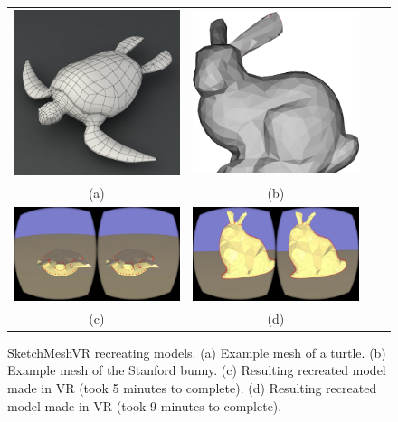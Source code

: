 \begin{figure}[!h]
    \centering
    \setlength{\tabcolsep}{0.0130\linewidth}
    \begin{tabular}{@{}cccc@{}}
    \includegraphics[width=0.45\linewidth]{figures/example_model_turtle}&
        \includegraphics[width=0.45\linewidth]{figures/example_model_bunny}\\
    (a)&(b)\\

  	\includegraphics[width=0.45\linewidth]{figures/results_turtle_model}&
  	\includegraphics[width=0.45\linewidth]{figures/results_bunny_model}\\
(c)&(d)\\
    \end{tabular}
    \caption[SketchMeshVR turtle and Stanford bunny model]{SketchMeshVR recreating models.
    	  \textup{(a)} Example mesh of a turtle.
    	  \textup{(b)} Example mesh of the Stanford bunny.
	  \textup{(c)} Resulting recreated model made in VR (took 5 minutes to complete).
	  \textup{(d)} Resulting recreated model made in VR (took 9 minutes to complete).
      \label{fig:recreate_turtle_bunny}}
\end{figure}

